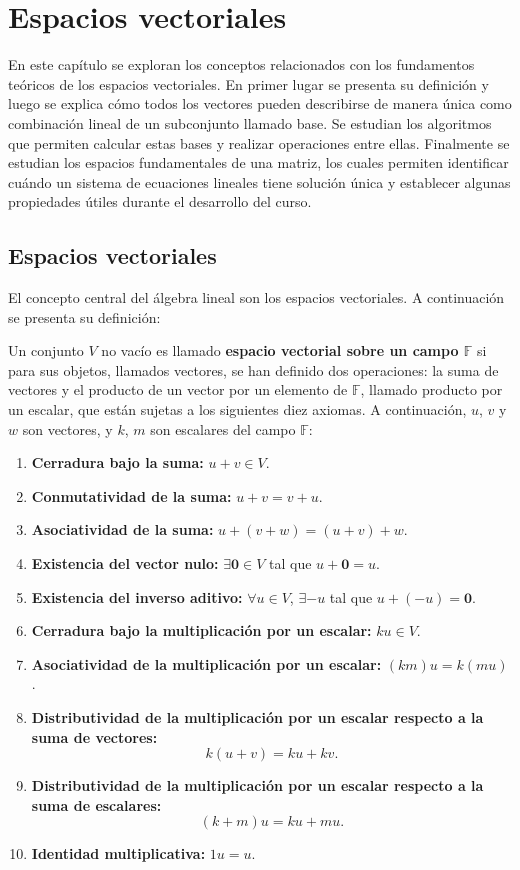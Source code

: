 \chapter{Espacios vectoriales}
En este capítulo se exploran los conceptos relacionados con los fundamentos teóricos de los espacios vectoriales. En primer lugar se presenta su definición y luego se explica cómo todos los vectores pueden describirse de manera única como combinación lineal de un subconjunto llamado base. Se estudian los algoritmos que permiten calcular estas bases y realizar operaciones entre ellas. Finalmente se estudian los espacios fundamentales de una matriz, los cuales permiten identificar cuándo un sistema de ecuaciones lineales tiene solución única y establecer algunas propiedades útiles durante el desarrollo del curso.

\section{Espacios vectoriales}
El concepto central del álgebra lineal son los espacios vectoriales. A continuación se presenta su definición: 

\begin{definition} \label{defespvectorial}
Un conjunto $V$ no vacío es llamado \textbf{espacio vectorial sobre un campo $\mathbb{F}$} si para sus objetos, llamados vectores, se han definido dos operaciones: la suma de vectores y el producto de un vector por un elemento de $\mathbb{F}$, llamado producto por un escalar, que están sujetas a los siguientes diez axiomas. A continuación, $u$, $v$ y $w$ son vectores, y $k$, $m$ son escalares del campo $\mathbb{F}$:

\begin{enumerate}[$1.$] 
\item \textbf{Cerradura bajo la suma:} $u + v \in V$.  
\item \textbf{Conmutatividad de la suma:} $u + v = v + u$. 
\item \textbf{Asociatividad de la suma:} $u + (v + w) = (u + v) + w$. 
\item \textbf{Existencia del vector nulo:} $\exists \mathbf{0} \in V$ tal que $u + \mathbf{0} = u$. 
\item \textbf{Existencia del inverso aditivo:} $\forall u \in V$, $\exists -u$ tal que $u + (-u) = \mathbf{0}$. 
\item \textbf{Cerradura bajo la multiplicación por un escalar:} $k u \in V$. 
\item \textbf{Asociatividad de la multiplicación por un escalar:} $(km)u = k(m u)$. 
\item \textbf{Distributividad de la multiplicación por un escalar respecto a la suma de vectores:} 
$$k(u+v) = k u + k v.$$
\item \textbf{Distributividad de la multiplicación por un escalar respecto a la suma de escalares:} 
$$(k+m)u = k u + m u.$$
\item \textbf{Identidad multiplicativa:} $1u = u$.
\end{enumerate}
\end{definition}

